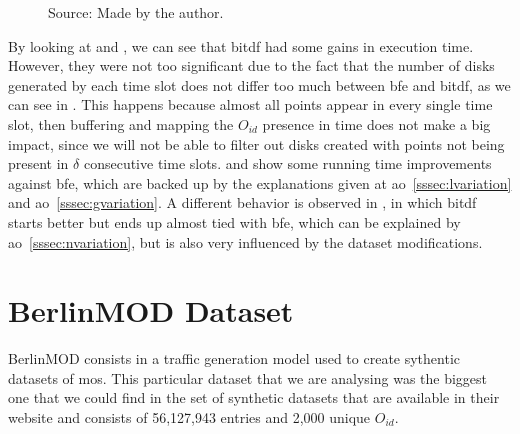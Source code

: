 {\begin{figure}[h!]
\begin{subfigure}[t]{0.48\textwidth}
        \label{fig:trucks_disks}
    \end{subfigure}
    \footnotesize{Source: Made by the author.}
    \label{fig:trucks_results2}
\end{figure}

By looking at  and , we can see that \ac{bitdf} had some gains in
execution time. However, they were not too significant due to the fact that the number of disks generated by each time
slot does not differ too much between \ac{bfe} and \ac{bitdf}, as we can see in . This happens
because almost all points appear in every single time slot, then buffering and mapping the $O_{id}$ presence in time
does not make a big impact, since we will not be able to filter out disks created with points not being present in
$\delta$ consecutive time slots.  and  show some running time
improvements against \ac{bfe}, which are backed up by the explanations given at \ac{ao}~\ref{sssec:lvariation} and
\ac{ao}~\ref{sssec:gvariation}. A different behavior is observed in , in which \ac{bitdf}
starts better but ends up almost tied with \ac{bfe}, which can be explained by \ac{ao}~\ref{sssec:nvariation}, but is
also very influenced by the dataset modifications.

\section{BerlinMOD Dataset}
\label{sec:berlinmod}
BerlinMOD consists in a traffic generation model \cite{berlinmodpaper} used to create sythentic datasets of \acp{mo}.
This particular dataset that we are analysing was the biggest one that we could find in the set of synthetic datasets
that are available in their website \cite{berlinmod} and consists of 56,127,943 entries and 2,000 unique $O_{id}$.

}
